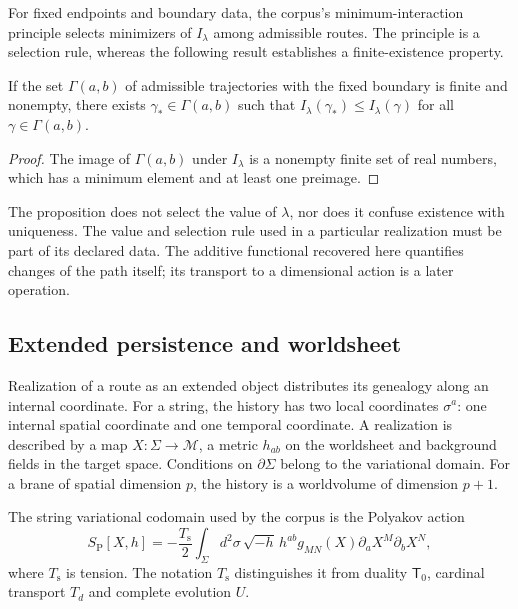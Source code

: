 For fixed endpoints and boundary data, the corpus's
minimum-interaction principle selects minimizers of
\(I_\lambda\) among admissible routes. The principle
is a selection rule, whereas the following
result establishes a finite-existence property.

\begin{proposition}
If the set \(\Gamma(a,b)\) of admissible trajectories
with the fixed boundary is finite and nonempty, there exists
\(\gamma_*\in\Gamma(a,b)\) such that
\(I_\lambda(\gamma_*)\leq I_\lambda(\gamma)\)
for all \(\gamma\in\Gamma(a,b)\).
\end{proposition}
\begin{proof}
The image of \(\Gamma(a,b)\) under \(I_\lambda\) is
a nonempty finite set of real numbers, which has
a minimum element and at least one preimage.
\end{proof}

The proposition does not select the value of \(\lambda\),
nor does it confuse existence with uniqueness. The value and
selection rule used in a particular realization
must be part of its declared data. The additive
functional recovered here quantifies changes of the path
itself; its transport to a dimensional action is
a later operation.

\subsection{Extended persistence and worldsheet}

Realization of a route as an extended object distributes
its genealogy along an internal coordinate. For a string,
the history has two local coordinates \(\sigma^a\):
one internal spatial coordinate and one temporal coordinate. A realization is
described by a map \(X:\Sigma\to\mathcal M\), a
metric \(h_{ab}\) on the worldsheet and background
fields in the target space. Conditions on
\(\partial\Sigma\) belong to the variational domain.
For a brane of spatial dimension \(p\), the history
is a worldvolume of dimension \(p+1\).

The string variational codomain used by the corpus
is the Polyakov action
\begin{equation}
 S_{\mathrm P}[X,h]
 =-\frac{T_{\mathrm s}}2\int_\Sigma d^2\sigma\,
 \sqrt{-h}\,h^{ab}g_{MN}(X)
             \partial_aX^M\partial_bX^N,
 \label{iv:eq:polyakov}
\end{equation}
where \(T_{\mathrm s}\) is tension. The notation
\(T_{\mathrm s}\) distinguishes it from duality
\(\mathsf T_0\), cardinal transport \(T_d\)
and complete evolution \(U\).

